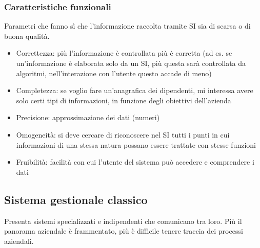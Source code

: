 \subsubsection{Caratteristiche funzionali}
\label{subs:Caratteristiche funzionali}
Parametri che fanno s\`i che l'informazione raccolta tramite SI sia di scarsa
o di buona qualit\`a.
\begin{itemize}
  \item Correttezza: pi\`u l'informazione \`e controllata pi\`u \`e corretta
  (ad es. se un'informazione \`e elaborata solo da un SI, pi\`u questa sar\`a
  controllata da algoritmi, nell'interazione con l'utente questo accade di meno)
  \item Completezza: se voglio fare un'anagrafica dei dipendenti, mi interessa avere solo certi
  tipi di informazioni, in funzione degli obiettivi dell'azienda
  \item Precisione: approssimazione dei dati (numeri)
  \item Omogeneit\`a: si deve cercare di riconoscere nel SI tutti i punti in
  cui informazioni di una stessa natura possano essere trattate con stesse funzioni
  \item Fruibilit\`a: facilit\`a con cui l'utente del sistema pu\`o accedere e comprendere
  i dati
\end{itemize}
\subsection{Sistema gestionale classico}
\label{sub:Sistema gestionale classico}
Presenta sistemi specializzati e indipendenti che comunicano tra loro.
Pi\`u il panorama aziendale \`e frammentato, pi\`u \`e difficile tenere
traccia dei processi aziendali.